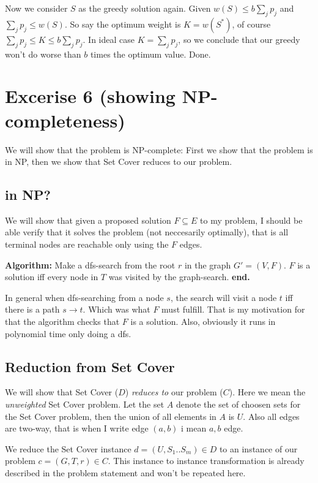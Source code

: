 \documentclass[a4paper,11pt]{article}
\begin{document}
Now we consider $S$ as the greedy solution again.
Given $w(S) \leq b \sum_{j} p_j$ and $\sum_{j} p_j \leq w(S)$.
So say the optimum weight is $K=w(S^*)$, of course
$\sum_{j} p_j \leq K \leq b \sum_{j} p_j$.
In ideal case $K = \sum_{j} p_j$,
so we conclude that our greedy won't do worse than $b$
times the optimum value. Done.

\section{Excerise 6 (showing NP-completeness)}

We will show that the problem is NP-complete:
First we show that the problem is in NP, then
we show that Set Cover reduces to our problem.

\subsection{in NP?}

We will show that given a proposed solution $F \subseteq E$
to my problem, I should be able verify that it
solves the problem (not neccesarily optimally),
that is all terminal nodes are reachable only using the $F$ edges.

\textbf{Algorithm:} Make a dfs-search from the root $r$ in the graph
$G' = (V, F)$. $F$ is a solution iff every node in $T$
was visited by the graph-search. \textbf{end.}

In general when dfs-searching from a node $s$,
the search will visit a node $t$ iff there is a path $s \to t$.
Which was what $F$ must fulfill. That is my motivation for that
the algorithm checks that $F$ is a solution.
Also, obviously it runs in polynomial time only doing a dfs.

\subsection{Reduction from Set Cover}

We will show that Set Cover ($D$) \emph{reduces to} our problem ($C$).
Here we mean the \emph{unweighted} Set Cover problem. Let the set
$A$ denote the set of choosen sets for the Set Cover problem,
then the union of all elements in $A$ is $U$.
Also all edges are two-way, that is when I write edge $(a, b)$ i mean
${a, b}$ edge.

We reduce the Set Cover instance $d = (U, S_1..S_m) \in D$ to an instance
of our problem $c = (G, T, r) \in C$. This instance to instance transformation is
already described in the problem statement and won't be repeated here.
\end{document}
